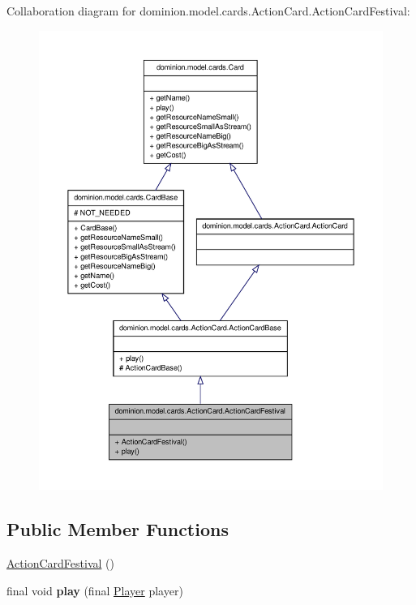 \-Collaboration diagram for dominion.\-model.\-cards.\-Action\-Card.\-Action\-Card\-Festival\-:
\nopagebreak
\begin{figure}[H]
\begin{center}
\leavevmode
\includegraphics[width=350pt]{classdominion_1_1model_1_1cards_1_1ActionCard_1_1ActionCardFestival__coll__graph}
\end{center}
\end{figure}
\subsection*{\-Public \-Member \-Functions}
\begin{DoxyCompactItemize}
\item 
\hyperlink{classdominion_1_1model_1_1cards_1_1ActionCard_1_1ActionCardFestival_a50f01a586bc6b368d3e9351ba28b789a}{\-Action\-Card\-Festival} ()
\item 
\hypertarget{classdominion_1_1model_1_1cards_1_1ActionCard_1_1ActionCardFestival_a7314e2c723bbca0892ba4ea4b9d4b099}{final void {\bfseries play} (final \hyperlink{interfacedominion_1_1model_1_1Player}{\-Player} player)}\label{classdominion_1_1model_1_1cards_1_1ActionCard_1_1ActionCardFestival_a7314e2c723bbca0892ba4ea4b9d4b099}

\end{DoxyCompactItemize}


